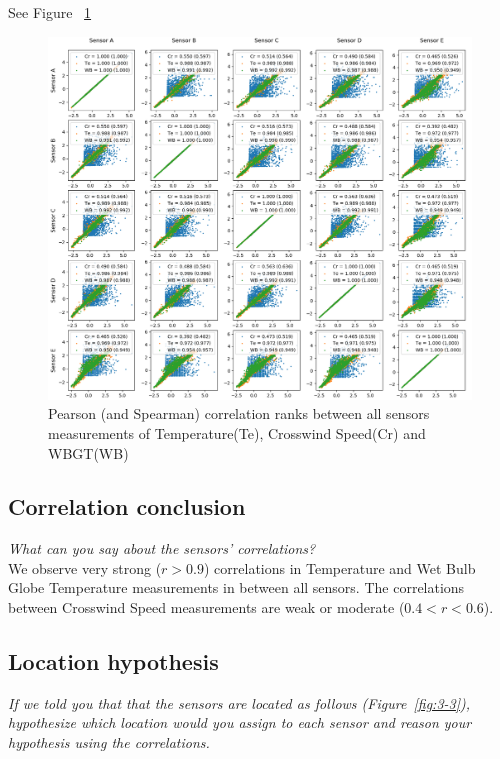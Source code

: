 \documentclass{article}
\begin{document}
See Figure ~\ref{fig:3-1}

\begin{figure}[!htb]
\centering
\includegraphics[width=\textwidth]{3-1-scatter.png}
\caption{Pearson (and Spearman) correlation ranks between all sensors measurements of Temperature(Te), Crosswind Speed(Cr) and WBGT(WB)}
\label{fig:3-1}
\end{figure}


\newpage

\subsection{Correlation conclusion}
\textit{
What can you say about the sensors’ correlations?
}\\

We observe very strong (\(r>0.9\)) correlations in Temperature and Wet Bulb Globe Temperature measurements in between all sensors.
The correlations between Crosswind Speed measurements are weak or moderate (\(0.4<r<0.6\)).


\subsection{Location hypothesis}
\textit{
If we told you that that the sensors are located as follows (Figure~\ref{fig:3-3}), hypothesize which location would you assign to each sensor and reason your hypothesis using the correlations.
}\\
\end{document}
